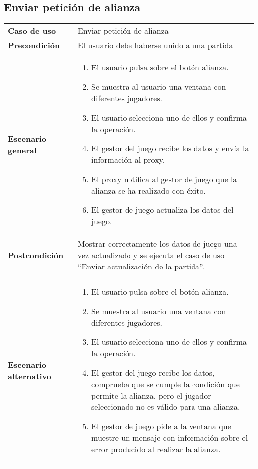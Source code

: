 \subsection{Enviar petición de alianza}

{\footnotesize
\begin{tabularx}{0.95\textwidth}{p{}|X}

\textbf{Caso de uso} & Enviar petición de alianza \\

\textbf{Precondición} & El usuario debe haberse unido a una partida \\

\textbf{Escenario general} & \begin{enumerate}
\item El usuario pulsa sobre el botón alianza.
\item Se muestra al usuario una ventana con diferentes jugadores.
\item El usuario selecciona uno de ellos y confirma la operación.
\item El gestor del juego recibe los datos y envía la información al proxy.
\item El proxy notifica al gestor de juego que la alianza se ha realizado con
éxito.
\item El gestor de juego actualiza los datos del juego.
\end{enumerate} \\
\textbf{Postcondición} & Mostrar correctamente los datos de juego una vez
actualizado y se ejecuta el caso de uso  ``Enviar actualización de
la partida''. \\ \\
\textbf{Escenario alternativo} & \begin{enumerate}
\item El usuario pulsa sobre el botón alianza.
\item Se muestra al usuario una ventana con diferentes jugadores.
\item El usuario selecciona uno de ellos y confirma la operación.
\item El gestor del juego recibe los datos, comprueba que se cumple la condición
que permite la alianza, pero el jugador seleccionado no es válido para una
alianza.
\item El gestor de juego pide a la ventana que muestre un mensaje con
información sobre el error producido al realizar la alianza.
\end{enumerate}\\
\end{tabularx}
}

